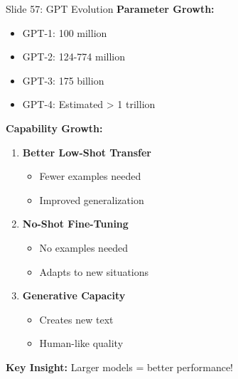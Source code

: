 \documentclass[8pt]{beamer}
\begin{document}
	\begin{frame}{Slide 57: GPT Evolution}
		\fontsize{6.5}{7.5}\selectfont
		\textbf{Parameter Growth:}
		\begin{itemize}
			\item GPT-1: 100 million
			\item GPT-2: 124-774 million
			\item GPT-3: 175 billion
			\item GPT-4: Estimated > 1 trillion
		\end{itemize}
		
		\vspace{0.1cm}
		\textbf{Capability Growth:}
		\begin{enumerate}
			\item \textbf{Better Low-Shot Transfer}
			\begin{itemize}
				\item Fewer examples needed
				\item Improved generalization
			\end{itemize}
			\item \textbf{No-Shot Fine-Tuning}
			\begin{itemize}
				\item No examples needed
				\item Adapts to new situations
			\end{itemize}
			\item \textbf{Generative Capacity}
			\begin{itemize}
				\item Creates new text
				\item Human-like quality
			\end{itemize}
		\end{enumerate}
		
		\textcolor{myblue}{\textbf{Key Insight:}} Larger models = better performance!
	\end{frame}
	
\end{document}
